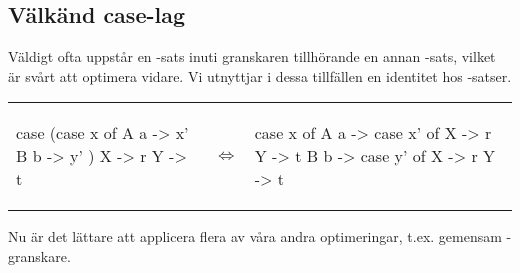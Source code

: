 \documentclass[../Optimise]{subfiles}
\begin{document}
\subsection{Välkänd case-lag}

Väldigt ofta uppstår en -sats inuti granskaren tillhörande en annan -sats, 
vilket är svårt att optimera vidare.
Vi utnyttjar i dessa tillfällen en identitet hos -satser. \cite{santos}



\begin{tabular}{ m{5cm} m{0.5cm} m{5cm} }
\begin{codeEx}
 case (case x of
         A a -> x'
         B b -> y'
      )
   X -> r
   Y -> t
\end{codeEx}
	& $\Leftrightarrow$
	&
\begin{codeEx}
 case x of
     A a -> case x' of
              X -> r
              Y -> t
     B b -> case y' of
              X -> r
              Y -> t
\end{codeEx}
\\
\end{tabular}

Nu är det lättare att applicera flera av våra andra optimeringar, 
t.ex. gemensam -granskare. 
\end{document}
